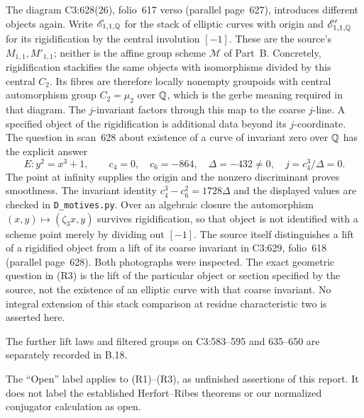 \begin{enumerate}
The diagram C3:628(26), folio~617 verso (parallel page~627), introduces different
objects again. Write $\mathscr E_{1,1,\mathbb Q}$ for the stack of
elliptic curves with origin and $\mathscr E'_{1,1,\mathbb Q}$ for its
rigidification by the central involution $[-1]$. These are the
source's $M_{1,1},M'_{1,1}$; neither is the affine group scheme
$\mathcal M$ of Part~B. Concretely, rigidification stackifies the
same objects with isomorphisms divided by this central $C_2$.
Its fibres are therefore locally nonempty groupoids with central
automorphism group $C_2=\mu_2$ over $\mathbb Q$, which is the gerbe
meaning required in that diagram. The $j$-invariant factors
through this map to the coarse $j$-line. A specified object of
the rigidification is additional data beyond its $j$-coordinate.
The question in scan~628 about existence of a curve of invariant
zero over $\mathbb Q$ has the explicit answer
\[
 E:y^2=x^3+1,\qquad c_4=0,\quad c_6=-864,\quad
 \Delta=-432\ne0,\quad j=c_4^3/\Delta=0.
 \tag{B.16.19}
\]
The point at infinity supplies the origin and the nonzero
discriminant proves smoothness. The invariant identity
$c_4^3-c_6^2=1728\Delta$ and the displayed values are checked
in \texttt{D\_motives.py}. Over an algebraic closure the
automorphism $(x,y)\mapsto(\zeta_3x,y)$ survives rigidification,
so that object is not identified with a scheme point merely
by dividing out $[-1]$. The source itself distinguishes a lift
of a rigidified object from a lift of its coarse invariant in
C3:629, folio~618 (parallel page~628). Both photographs were
inspected. The exact geometric question in (R3)
is the lift of the particular object or section specified by
the source, not the existence of an elliptic curve with that
coarse invariant. No integral extension of this stack comparison
at residue characteristic two is asserted here.

The further lift laws and filtered groups on C3:583--595 and
635--650 are separately recorded in B.18.
\end{enumerate}
The ``Open'' label applies to (R1)--(R3), as unfinished assertions
of this report. It does not label the established Herfort--Ribes
theorems or our normalized conjugator calculation as open.
